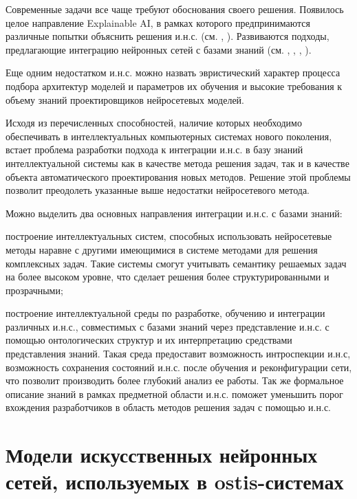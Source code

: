 Современные задачи все чаще требуют обоснования своего решения. Появилось целое направление Explainable AI, в рамках которого предпринимаются различные попытки объяснить решения и.н.с. (см. , ). Развиваются подходы, предлагающие интеграцию нейронных сетей с базами знаний (см. , , , ).

Еще одним недостатком и.н.с. можно назвать эвристический характер процесса подбора архитектур моделей и параметров их обучения и высокие требования к объему знаний проектировщиков нейросетевых моделей.

Исходя из перечисленных способностей, наличие которых необходимо обеспечивать в интеллектуальных компьютерных системах нового поколения, встает проблема разработки подхода к интеграции и.н.с. в базу знаний интеллектуальной системы как в качестве метода решения задач, так и в качестве объекта автоматического проектирования новых методов. Решение этой проблемы позволит преодолеть указанные выше недостатки нейросетевого метода.

Можно выделить два основных направления интеграции и.н.с. с базами знаний:
\begin{textitemize}
	\item построение интеллектуальных систем, способных использовать нейросетевые методы наравне с другими имеющимися в системе методами для решения комплексных задач. Такие системы смогут учитывать семантику решаемых задач на более высоком уровне, что сделает решения более структурированными и прозрачными;
	\item построение интеллектуальной среды по разработке, обучению и интеграции различных и.н.с., совместимых с базами знаний через представление и.н.с. с помощью онтологических структур и их интерпретацию средствами представления знаний. Такая среда предоставит возможность интроспекции и.н.с, возможность сохранения состояний и.н.с. после обучения и реконфигурации сети, что позволит производить более глубокий анализ ее работы. Так же формальное описание знаний в рамках предметной области и.н.с. поможет уменьшить порог вхождения разработчиков в область методов решения задач с помощью и.н.с.
\end{textitemize}


\section{Модели искусственных нейронных сетей, используемых в ostis-системах}
\label{sec_chapter_ann_models}

